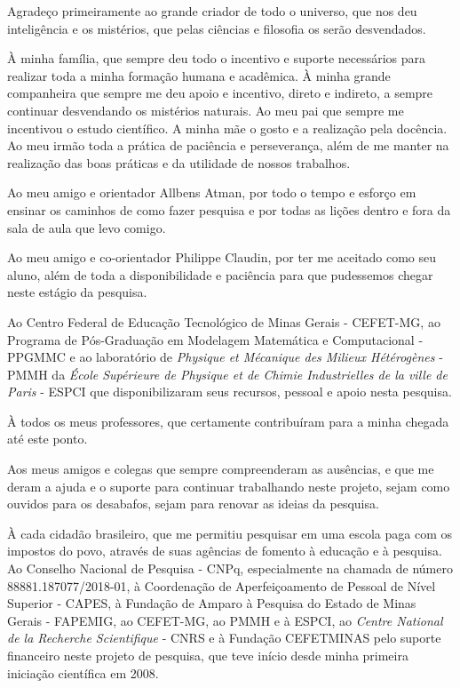 \begin{agradecimentos}[Agradecimentos]

Agradeço primeiramente ao grande criador de todo o universo, que nos deu inteligência e os mistérios, que pelas ciências e filosofia os serão desvendados.

À minha família, que sempre deu todo o incentivo e suporte necessários para realizar toda a minha formação humana e acadêmica. À minha grande companheira que sempre me deu apoio e incentivo, direto e indireto, a sempre continuar desvendando os mistérios naturais. Ao meu pai que sempre me incentivou o estudo científico. A minha mãe o gosto e a realização pela docência. Ao meu irmão toda a prática de paciência e perseverança, além de me manter na realização das boas práticas e da utilidade de nossos trabalhos.

Ao meu amigo e orientador Allbens Atman, por todo o tempo e esforço em ensinar os caminhos de como fazer pesquisa e por todas as lições dentro e fora da sala de aula que levo comigo.

Ao meu amigo e co-orientador Philippe Claudin, por ter me aceitado como seu aluno, além de toda a disponibilidade e paciência para que pudessemos chegar neste estágio da pesquisa.

Ao Centro Federal de Educação Tecnológico de Minas Gerais - CEFET-MG, ao Programa de Pós-Graduação em Modelagem Matemática e Computacional - PPGMMC e ao laboratório de \textit{Physique et Mécanique des Milieux Hétérogènes} - PMMH da \textit{École Supérieure de Physique et de Chimie Industrielles de la ville de Paris} - ESPCI que disponibilizaram seus recursos, pessoal e apoio nesta pesquisa.

À todos os meus professores, que certamente contribuíram para a minha chegada até este ponto.

Aos meus amigos e colegas que sempre compreenderam as ausências, e que me deram a ajuda e o suporte para continuar trabalhando neste projeto, sejam como ouvidos para os desabafos, sejam para renovar as ideias da pesquisa.



À cada cidadão brasileiro, que me permitiu pesquisar em uma escola paga com os impostos do povo, através de suas agências de fomento à educação e à pesquisa. Ao Conselho Nacional de Pesquisa - CNPq, especialmente na chamada de número 88881.187077/2018-01, à Coordenação de Aperfeiçoamento de Pessoal de Nível Superior - CAPES, à Fundação de Amparo à Pesquisa do Estado de Minas Gerais - FAPEMIG, ao CEFET-MG, ao PMMH e à ESPCI, ao \textit{Centre National de la Recherche Scientifique} - CNRS e à Fundação CEFETMINAS pelo suporte financeiro neste projeto de pesquisa, que teve início desde minha primeira iniciação científica em 2008.

\end{agradecimentos}
